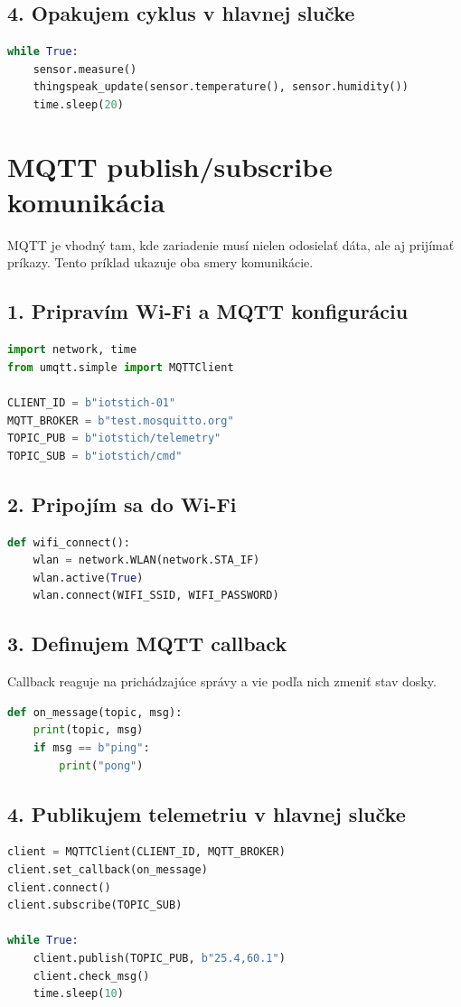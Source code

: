 \subsection*{4. Opakujem cyklus v hlavnej slučke}
\begin{lstlisting}[language=Python]
while True:
	sensor.measure()
	thingspeak_update(sensor.temperature(), sensor.humidity())
	time.sleep(20)
\end{lstlisting}

\clearpage
\section{MQTT publish/subscribe komunikácia}
MQTT je vhodný tam, kde zariadenie musí nielen odosielať dáta, ale aj prijímať príkazy. Tento príklad ukazuje oba smery komunikácie.

\subsection*{1. Pripravím Wi-Fi a MQTT konfiguráciu}
\begin{lstlisting}[language=Python]
import network, time
from umqtt.simple import MQTTClient

CLIENT_ID = b"iotstich-01"
MQTT_BROKER = b"test.mosquitto.org"
TOPIC_PUB = b"iotstich/telemetry"
TOPIC_SUB = b"iotstich/cmd"
\end{lstlisting}

\subsection*{2. Pripojím sa do Wi-Fi}
\begin{lstlisting}[language=Python]
def wifi_connect():
	wlan = network.WLAN(network.STA_IF)
	wlan.active(True)
	wlan.connect(WIFI_SSID, WIFI_PASSWORD)
\end{lstlisting}

\subsection*{3. Definujem MQTT callback}
Callback reaguje na prichádzajúce správy a vie podľa nich zmeniť stav dosky.
\begin{lstlisting}[language=Python]
def on_message(topic, msg):
	print(topic, msg)
	if msg == b"ping":
		print("pong")
\end{lstlisting}

\subsection*{4. Publikujem telemetriu v hlavnej slučke}
\begin{lstlisting}[language=Python]
client = MQTTClient(CLIENT_ID, MQTT_BROKER)
client.set_callback(on_message)
client.connect()
client.subscribe(TOPIC_SUB)

while True:
	client.publish(TOPIC_PUB, b"25.4,60.1")
	client.check_msg()
	time.sleep(10)
\end{lstlisting}
